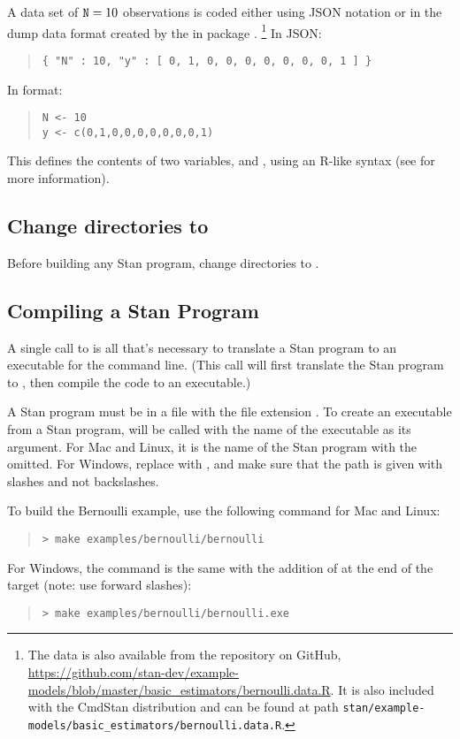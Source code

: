 A data set of $\mbox{{\tt N}}=10$ observations is coded either
using JSON notation or in the dump data format created by 
the  in package .
%
\footnote{
The data is also available from the  repository
on GitHub,
\url{https://github.com/stan-dev/example-models/blob/master/basic_estimators/bernoulli.data.R}.
It is also included with the CmdStan distribution and can be found at path
\nolinkurl{stan/example-models/basic_estimators/bernoulli.data.R}.
}
In JSON:
%
\begin{quote}
\begin{Verbatim}
{ "N" : 10, "y" : [ 0, 1, 0, 0, 0, 0, 0, 0, 0, 1 ] }
\end{Verbatim}
\end{quote}
%
In  format:
%
\begin{quote}
\begin{Verbatim}
N <- 10
y <- c(0,1,0,0,0,0,0,0,0,1)
\end{Verbatim}
\end{quote}
%
This defines the contents of two variables,  and ,
using an R-like syntax (see  for more information).

\subsection{Change directories to }

Before building any Stan program, change directories to .

\subsection{Compiling a Stan Program}

A single call to  is all that's necessary to translate a
Stan program to an executable for the command line. (This call will
first translate the Stan program to \Cpp, then compile the \Cpp code
to an executable.)

A Stan program must be in a file with the file extension
. To create an executable from a Stan program, 
will be called with the name of the executable as its argument. For
Mac and Linux, it is the name of the Stan program with the
 omitted. For Windows, replace  with ,
and make sure that the path is given with slashes and not backslashes.

To build the Bernoulli example, use the following command for Mac and
Linux:
%
\begin{quote}
\begin{Verbatim}[fontshape=sl]
> make examples/bernoulli/bernoulli
\end{Verbatim}
\end{quote}
%
For Windows, the command is the same with the addition of 
at the end of the target (note: use forward slashes):
\begin{quote}
\begin{Verbatim}[fontshape=sl]
> make examples/bernoulli/bernoulli.exe
\end{Verbatim}
\end{quote}

